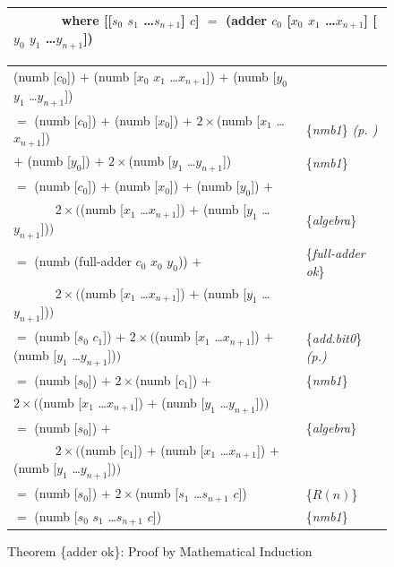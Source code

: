 \begin{figure}
\begin{center}
\begin{tabular}{l}
 ~~~~~~ where [[$s_0$ $s_1$ \dots $s_{n+1}$] $c$] $=$ (adder $c_0$ [$x_0$ $x_1$ \dots $x_{n+1}$] [$y_0$ $y_1$ \dots $y_{n+1}$]) \\
\hline
\end{tabular}
\begin{tabular}{ll}
\hspace*{3mm}(numb [$c_0$]) $+$ (numb [$x_0$ $x_1$ \dots $x_{n+1}$]) $+$ (numb [$y_0$ $y_1$ \dots $y_{n+1}$])& \\
$=$ (numb [$c_0$]) $+$ (numb [$x_0$]) $+$ $2\times$(numb [$x_1$ \dots $x_{n+1}$])                         & \{\emph{nmb1}\} \emph{(p. \pageref{nmb1})} \\
\hphantom{$=$ (numb [$c_0$]) }$+$ (numb [$y_0$]) $+$ $2\times$(numb [$y_1$ \dots $y_{n+1}$])                  & \{\emph{nmb1}\} \\
$=$ (numb [$c_0$]) $+$ (numb [$x_0$]) + (numb [$y_0$]) $+$                                                & \\
 ~~~~~~ $2\times($(numb [$x_1$ \dots $x_{n+1}$]) $+$ (numb [$y_1$ \dots $y_{n+1}$])$)$                    & \{\emph{algebra}\} \\
$=$ (numb (full-adder $c_0$ $x_0$ $y_0$)) $+$                                                             & \{\emph{full-adder ok}\} \\
 ~~~~~~ $2\times($(numb [$x_1$ \dots $x_{n+1}$]) $+$ (numb [$y_1$ \dots $y_{n+1}$])$)$                    & \\
$=$ (numb [$s_0$ $c_1$]) + $2\times($(numb [$x_1$ \dots $x_{n+1}$]) $+$ (numb [$y_1$ \dots $y_{n+1}$])$)$ & \{\emph{add.bit0}\} \emph{(p.\pageref{fig:full-adder-thm})} \\
$=$ (numb [$s_0$]) $+$ $2\times$(numb [$c_1$]) +                                                          & \{\emph{nmb1}\} \\
\hphantom{$=$ (numb [$s_0$ $c_1$]) + }$2\times($(numb [$x_1$ \dots $x_{n+1}$]) $+$ (numb [$y_1$ \dots $y_{n+1}$])$)$  & \\
$=$ (numb [$s_0$]) $+$                                                                                    & \{\emph{algebra}\} \\
 ~~~~~~ $2\times($(numb [$c_1$]) $+$ (numb [$x_1$ \dots $x_{n+1}$]) $+$ (numb [$y_1$ \dots $y_{n+1}$])$)$ & \\
$=$ (numb [$s_0$]) $+$ $2\times$(numb [$s_1$ \dots $s_{n+1}$ $c$])                                        & \{$R(n)$\} \\
$=$ (numb [$s_0$ $s_1$ \dots $s_{n+1}$ $c$])                                                              & \{\emph{nmb1}\} \\
\end{tabular}
\end{center}
\caption{Theorem \{adder ok\}: Proof by Mathematical Induction}
\label{fig:adder-thm-prf}
\end{figure}

